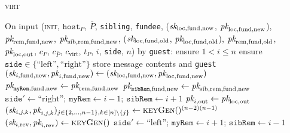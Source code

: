 \begin{center}
\begin{processbox}{\textsc{virt}}
\begin{algorithmic}[1]
      \State {}
      \State On input (\textsc{init}, $\texttt{host}_P$, $\bar{P}$,
      \texttt{sibling}, \texttt{fundee}, ($\textit{sk}_{\mathrm{loc}, \mathrm{fund},
      \mathrm{new}}$, $\textit{pk}_{\mathrm{loc}, \mathrm{fund}, \mathrm{new}}$),
      $\textit{pk}_{\mathrm{rem}, \mathrm{fund}, \mathrm{new}}$, $\textit{pk}_{\mathrm{sib},
      \mathrm{rem}, \mathrm{fund}, \mathrm{new}}$, ($\textit{sk}_{\mathrm{loc},
      \mathrm{fund}, \mathrm{old}}$, $\textit{pk}_{\mathrm{loc}, \mathrm{fund},
      \mathrm{old}}$), $\textit{pk}_{\mathrm{rem}, \mathrm{fund}, \mathrm{old}}$,
      $\textit{pk}_{\mathrm{loc}, \mathrm{out}}$, $c_P$, $c_{\bar{P}}$,
      $c_{\mathrm{virt}}$, $t_P$, $i$, \texttt{side}, $n$) by \texttt{guest}:
      \label{code:virtual-layer:keys:init}
      \Indent
        \State ensure $1 < i \leq n$ 
        \label{code:virtual-layer:keys:init:check-i}
        \State ensure $\texttt{side} \in \{\text{``left''},
        \text{``right''}\}$
        \State store message contents and \texttt{guest}
        \State $(\textit{sk}_{i, \mathrm{fund}, \mathrm{new}}, \textit{pk}_{i, \mathrm{fund},
        \mathrm{new}}) \gets (\textit{sk}_{\mathrm{loc}, \mathrm{fund}, \mathrm{new}},
        \textit{pk}_{\mathrm{loc}, \mathrm{fund}, \mathrm{new}})$
        \State $\textit{pk}_{\texttt{myRem}, \mathrm{fund}, \mathrm{new}} \gets
        \textit{pk}_{\mathrm{rem}, \mathrm{fund}, \mathrm{new}}$
         
          \State $\textit{pk}_{\texttt{sibRem}, \mathrm{fund}, \mathrm{new}} \gets
          \textit{pk}_{\mathrm{sib}, \mathrm{rem}, \mathrm{fund}, \mathrm{new}}$
        \EndIf
          \State $\texttt{side}' \gets \text{``right''}$; $\texttt{myRem}
          \gets i-1$; $\texttt{sibRem} \gets i+1$
          \State $\textit{pk}_{i, \mathrm{out}} \gets \textit{pk}_{\mathrm{loc}, \mathrm{out}}$
          \State $(\textit{sk}_{i, j, k}, \textit{pk}_{i, j, k})_{j \in \{2, \dots, n-1\}, k \in
          [n] \setminus \{j\}} \gets \textsc{keyGen}()^{(n-2)(n-1)}$
          \State $(\textit{sk}_{i, \mathrm{rev}}, \textit{pk}_{i, \mathrm{rev}}) \gets
          \textsc{keyGen}()$
        \Else \: 
          \State $\texttt{side}' \gets \text{``left''}$; $\texttt{myRem} \gets
          i+1$; $\texttt{sibRem} \gets i-1$
          \State {}
\end{algorithmic}
\end{processbox}
\end{center}
